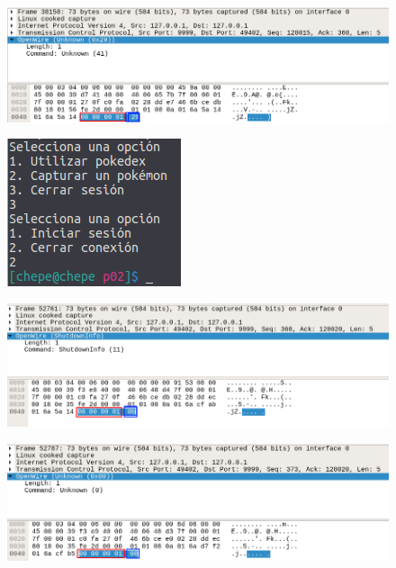 \documentclass[12pt]{article}
\begin{document}
\begin{figure}[H]
  \centering
  \includegraphics[width=\textwidth]{29}
  \caption{}
\end{figure}

\begin{figure}[H]
  \centering
  \includegraphics[width=\textwidth]{30}
  \caption{}
\end{figure}

\begin{figure}[H]
  \centering
  \includegraphics[width=\textwidth]{31}
  \caption{}
\end{figure}

\begin{figure}[H]
  \centering
  \includegraphics[width=\textwidth]{32}
  \caption{}
\end{figure}
\end{document}
